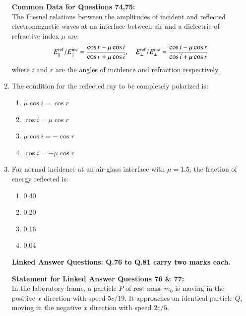 \documentclass[journal,13pt,onecolumn]{IEEEtran}
\begin{document}
\begin{enumerate}[itemsep = 1em]
\textbf{Common Data for Questions 74,75:} \\
The Fresnel relations between the amplitudes of incident and reflected electromagnetic waves at an interface between air and a dielectric of refractive index $\mu$ are:  
\[
E_\parallel^{\rm ref} / E_\parallel^{\rm inc} = \frac{\cos r - \mu \cos i}{\cos r + \mu \cos i}, \quad
E_\perp^{\rm ref} / E_\perp^{\rm inc} = \frac{\cos i - \mu \cos r}{\cos i + \mu \cos r}
\]  
where $i$ and $r$ are the angles of incidence and refraction respectively.


\item The condition for the reflected ray to be completely polarized is:

\hfill{}

\begin{multicols}{2}
\begin{enumerate}
    \item $\mu \cos i = \cos r$
    \item $\cos i = \mu \cos r$
    \item $\mu \cos i = - \cos r$
    \item $\cos i = - \mu \cos r$
\end{enumerate}
\end{multicols}

\item For normal incidence at an air-glass interface with $\mu=1.5$, the fraction of energy reflected is:

\hfill{}

\begin{multicols}{2}
\begin{enumerate}
    \item 0.40
    \item 0.20
    \item 0.16
    \item 0.04
\end{enumerate}
\end{multicols}

\newpage
\begin{center}
 \textbf{Linked Answer Questions: Q.76 to Q.81 carry two marks each.}   
\end{center}

\vspace{2em}


\textbf{Statement for Linked Answer Questions 76 \& 77:} \\
In the laboratory frame, a particle $P$ of rest mass $m_0$ is moving in the positive $x$ direction with speed $5c/19$. It approaches an identical particle $Q$, moving in the negative $x$ direction with speed $2c/5$.



\end{enumerate}
\end{document}
